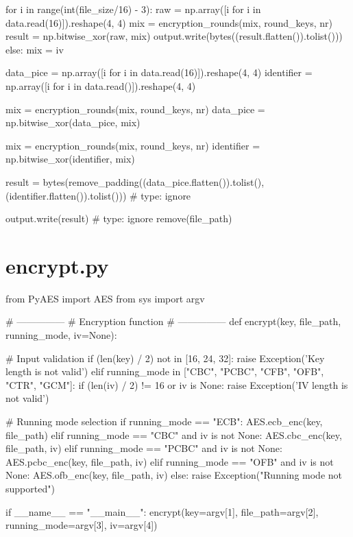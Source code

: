 \begin{python}
            for i in range(int(file_size/16) - 3):
                raw = np.array([i for i in data.read(16)]).reshape(4, 4)
                mix = encryption_rounds(mix, round_keys, nr)
                result = np.bitwise_xor(raw, mix)
                output.write(bytes((result.flatten()).tolist()))
        else:
            mix = iv

        data_pice = np.array([i for i in data.read(16)]).reshape(4, 4)
        identifier = np.array([i for i in data.read()]).reshape(4, 4)

        mix = encryption_rounds(mix, round_keys, nr)
        data_pice = np.bitwise_xor(data_pice, mix)

        mix = encryption_rounds(mix, round_keys, nr)
        identifier = np.bitwise_xor(identifier, mix)

        result = bytes(remove_padding((data_pice.flatten()).tolist(), (identifier.flatten()).tolist()))  # type: ignore

        output.write(result)  # type: ignore
    remove(file_path)

\end{python}

\section{encrypt.py}
\label{app:encrypt.py}

\begin{python}
from PyAES import AES
from sys import argv


# ---------------
# Encryption function
# ---------------
def encrypt(key, file_path, running_mode, iv=None):

    # Input validation
    if (len(key) / 2) not in [16, 24, 32]:
        raise Exception('Key length is not valid')
    elif running_mode in ["CBC", "PCBC", "CFB", "OFB", "CTR", "GCM"]:
        if (len(iv) / 2) != 16 or iv is None:
            raise Exception('IV length is not valid')

    # Running mode selection
    if running_mode == "ECB":
        AES.ecb_enc(key, file_path)
    elif running_mode == "CBC" and iv is not None:
        AES.cbc_enc(key, file_path, iv)
    elif running_mode == "PCBC" and iv is not None:
        AES.pcbc_enc(key, file_path, iv)
    elif running_mode == "OFB" and iv is not None:
        AES.ofb_enc(key, file_path, iv)
    else:
        raise Exception("Running mode not supported")


if __name__ == "__main__":
    encrypt(key=argv[1], file_path=argv[2], running_mode=argv[3], iv=argv[4])

\end{python}

